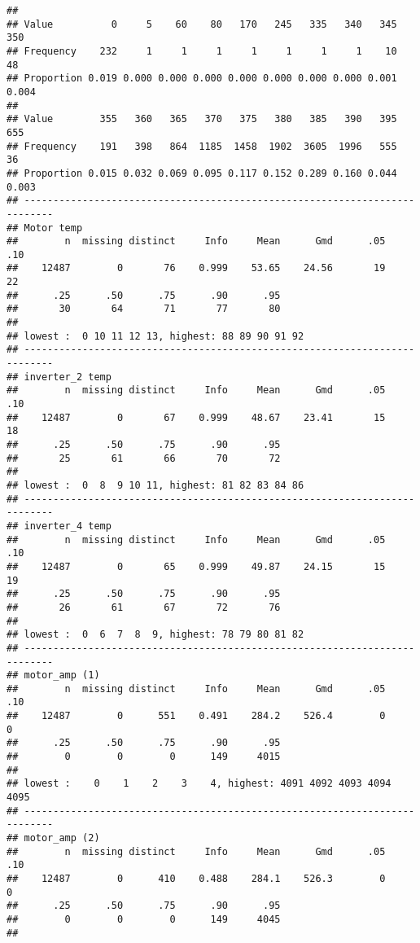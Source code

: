 \documentclass[]{article}
\begin{document}
\begin{verbatim}
##                                                                       
## Value          0     5    60    80   170   245   335   340   345   350
## Frequency    232     1     1     1     1     1     1     1    10    48
## Proportion 0.019 0.000 0.000 0.000 0.000 0.000 0.000 0.000 0.001 0.004
##                                                                       
## Value        355   360   365   370   375   380   385   390   395   655
## Frequency    191   398   864  1185  1458  1902  3605  1996   555    36
## Proportion 0.015 0.032 0.069 0.095 0.117 0.152 0.289 0.160 0.044 0.003
## ---------------------------------------------------------------------------
## Motor temp 
##        n  missing distinct     Info     Mean      Gmd      .05      .10 
##    12487        0       76    0.999    53.65    24.56       19       22 
##      .25      .50      .75      .90      .95 
##       30       64       71       77       80 
## 
## lowest :  0 10 11 12 13, highest: 88 89 90 91 92
## ---------------------------------------------------------------------------
## inverter_2 temp 
##        n  missing distinct     Info     Mean      Gmd      .05      .10 
##    12487        0       67    0.999    48.67    23.41       15       18 
##      .25      .50      .75      .90      .95 
##       25       61       66       70       72 
## 
## lowest :  0  8  9 10 11, highest: 81 82 83 84 86
## ---------------------------------------------------------------------------
## inverter_4 temp 
##        n  missing distinct     Info     Mean      Gmd      .05      .10 
##    12487        0       65    0.999    49.87    24.15       15       19 
##      .25      .50      .75      .90      .95 
##       26       61       67       72       76 
## 
## lowest :  0  6  7  8  9, highest: 78 79 80 81 82
## ---------------------------------------------------------------------------
## motor_amp (1) 
##        n  missing distinct     Info     Mean      Gmd      .05      .10 
##    12487        0      551    0.491    284.2    526.4        0        0 
##      .25      .50      .75      .90      .95 
##        0        0        0      149     4015 
## 
## lowest :    0    1    2    3    4, highest: 4091 4092 4093 4094 4095
## ---------------------------------------------------------------------------
## motor_amp (2) 
##        n  missing distinct     Info     Mean      Gmd      .05      .10 
##    12487        0      410    0.488    284.1    526.3        0        0 
##      .25      .50      .75      .90      .95 
##        0        0        0      149     4045 
##                                                                       

\end{verbatim}
\end{document}
